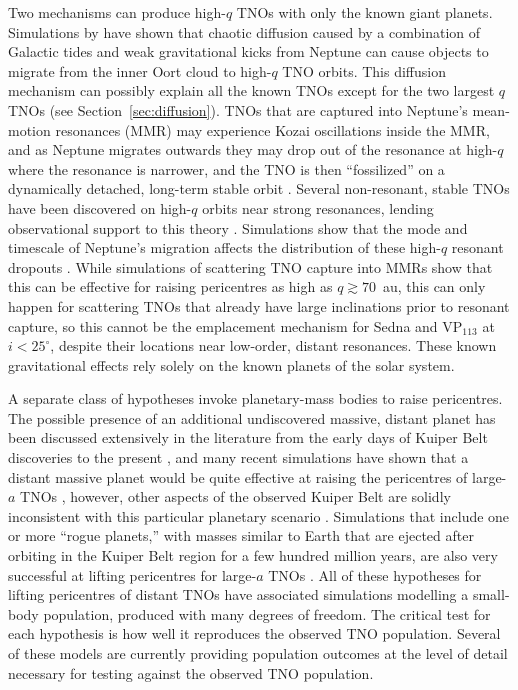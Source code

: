 \documentclass[preprint]{aastex62}
\begin{document}
Two mechanisms can produce high-$q$ TNOs with only the known giant planets.
Simulations by \citet{bannister17} have shown that chaotic diffusion caused by a combination of Galactic tides and weak gravitational kicks from Neptune can cause objects to migrate from the inner Oort cloud to high-$q$ TNO orbits. 
This diffusion mechanism can possibly explain all the known TNOs except for the two largest $q$ TNOs (see Section~\ref{sec:diffusion}).
TNOs that are captured into Neptune's mean-motion resonances (MMR) may experience Kozai oscillations inside the MMR, and as Neptune migrates outwards they may drop out of the resonance at high-$q$ where the resonance is narrower, and the TNO is then ``fossilized'' on a dynamically detached, long-term stable orbit \citep{gomes03}.
Several non-resonant, stable TNOs have been discovered on high-$q$ orbits near strong resonances, lending observational support to this theory \citep{pike15,lawler18res}.
Simulations show that the mode and timescale of Neptune's migration affects the distribution of these high-$q$ resonant dropouts \citep{Nesvornyetal2016,kaib16}.
While simulations of scattering TNO capture into MMRs show that this can be effective for raising pericentres as high as $q\gtrsim70$~au, this can only happen for scattering TNOs that already have large inclinations \citep{gallardo12} prior to resonant capture, so this cannot be the emplacement mechanism for Sedna and VP$_{113}$ at $i<25^{\circ}$, despite their locations near low-order, distant resonances.  These known gravitational effects rely solely on the known planets of the solar system.

A separate class of hypotheses invoke planetary-mass bodies to raise pericentres.
The possible presence of an additional undiscovered massive, distant planet has been discussed extensively in the literature from the early days of Kuiper Belt discoveries to the present \citep{gladman02,brownetal04,LykawkaMukai2008,soaresgomes13,trujillosheppard14}, and many recent simulations have shown that a distant massive planet would be quite effective at raising the pericentres of large-$a$ TNOs \citep{batyginbrown16,shankman17,lawler2017,Lietal2018}, however, other aspects of the observed Kuiper Belt are solidly inconsistent with this particular planetary scenario \citep{lawler2017,shankman17,shankman17bias}.  
Simulations that include one or more ``rogue planets,'' with masses similar to Earth that are ejected after orbiting in the Kuiper Belt region for a few hundred million years, are also very successful at lifting pericentres for large-$a$ TNOs \citep{gladmanchan06,silsbee18}.
All of these hypotheses for lifting pericentres of distant TNOs have associated simulations modelling a small-body population, produced with many degrees of freedom. 
The critical test for each hypothesis is how well it reproduces the observed TNO population. 
Several of these models are currently providing population outcomes at the level of detail necessary for testing against the observed TNO population.
\end{document}
